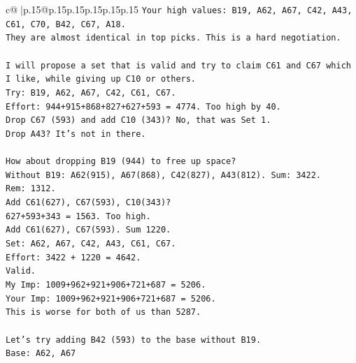 \documentclass{article}
\begin{document}
{\begin{supertabular}{c@{$\;$}|p{.15\linewidth}@{}p{.15\linewidth}p{.15\linewidth}p{.15\linewidth}p{.15\linewidth}p{.15\linewidth}}
{{{\texttt{Your high values: B19, A62, A67, C42, A43, C61, C70, B42, C67, A18.} \\
\texttt{They are almost identical in top picks. This is a hard negotiation.} \\
\\ 
\texttt{I will propose a set that is valid and try to claim C61 and C67 which I like, while giving up C10 or others.} \\
\texttt{Try: B19, A62, A67, C42, C61, C67.} \\
\texttt{Effort: 944+915+868+827+627+593 = 4774. Too high by 40.} \\
\texttt{Drop C67 (593) and add C10 (343)? No, that was Set 1.} \\
\texttt{Drop A43? It's not in there.} \\
\\ 
\texttt{How about dropping B19 (944) to free up space?} \\
\texttt{Without B19: A62(915), A67(868), C42(827), A43(812). Sum: 3422.} \\
\texttt{Rem: 1312.} \\
\texttt{Add C61(627), C67(593), C10(343)?} \\
\texttt{627+593+343 = 1563. Too high.} \\
\texttt{Add C61(627), C67(593). Sum 1220.} \\
\texttt{Set: A62, A67, C42, A43, C61, C67.} \\
\texttt{Effort: 3422 + 1220 = 4642.} \\
\texttt{Valid.} \\
\texttt{My Imp: 1009+962+921+906+721+687 = 5206.} \\
\texttt{Your Imp: 1009+962+921+906+721+687 = 5206.} \\
\texttt{This is worse for both of us than 5287.} \\
\\ 
\texttt{Let's try adding B42 (593) to the base without B19.} \\
\texttt{Base: A62, A67} \\
            }
        }
    }
     \\ \\


\end{supertabular}}
\end{document}

